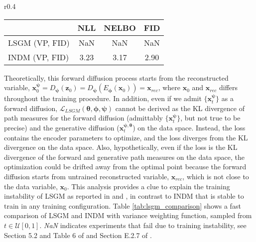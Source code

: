 \documentclass{article}
\theoremstyle{definition}
\theoremstyle{remark}
\begin{document}
	
	\begin{wraptable}{r}{0.4\textwidth}
		\vskip -0.2in
		\caption{LSGM training fails when using the variance weighting function.}
		\label{tab:lsgm_comparison}
		\scriptsize
		\centering
		\begin{tabular}{lccc}
			\toprule
			& NLL & NELBO & FID\\\midrule
			LSGM (VP, FID) & NaN & NaN & NaN \\
			INDM (VP, FID) & 3.23 & 3.17 & 2.90 \\
			\bottomrule
		\end{tabular}
		\vskip -0.1in
	\end{wraptable}
	Theoretically, this forward diffusion process starts from the reconstructed variable, $\mathbf{x}_{0}^{\bm{\psi}}=D_{\bm{\psi}}(\mathbf{z}_{0})=D_{\bm{\psi}}(E_{\bm{\phi}}(\mathbf{x}_{0}))=\mathbf{x}_{rec}$, where $\mathbf{x}_{0}$ and $\mathbf{x}_{rec}$ differs throughout the training procedure. In addition, even if we admit $\{\mathbf{x}_{t}^{\bm{\psi}}\}$ as a forward diffusion, $\mathcal{L}_{LSGM}(\bm{\theta},\bm{\phi},\bm{\psi})$ cannot be derived as the KL divergence of path measures for the forward diffusion (admittably $\{\mathbf{x}_{t}^{\bm{\psi}}\}$, but not true to be precise) and the generative diffusion ($\mathbf{x}_{t}^{\bm{\psi},\bm{\theta}}$) on the data space. Instead, the loss contains the encoder parameters to optimize, and the loss diverges from the KL divergence on the data space. Also, hypothetically, even if the loss is the KL divergence of the forward and generative path measures on the data space, the optimization could be drifted away from the optimal point because the forward diffusion starts from untrained reconstructed variable, $\mathbf{x}_{rec}$, which is not close to the data variable, $\mathbf{x}_{0}$. This analysis provides a clue to explain the training instability of LSGM as reported in \citet{vahdat2021score} and \citet{dockhorn2021score}, in contrast to INDM that is stable to train in any training configuration. Table \ref{tab:lsgm_comparison} shows a fast comparison of LSGM and INDM with variance weighting function, sampled from $t\in\mathcal{U}[0,1]$. \textit{NaN} indicates experiments that fail due to training instability, see Section 5.2 and Table 6 of \citet{vahdat2021score} and Section E.2.7 of \citet{dockhorn2021score}. 
	
\end{document}

